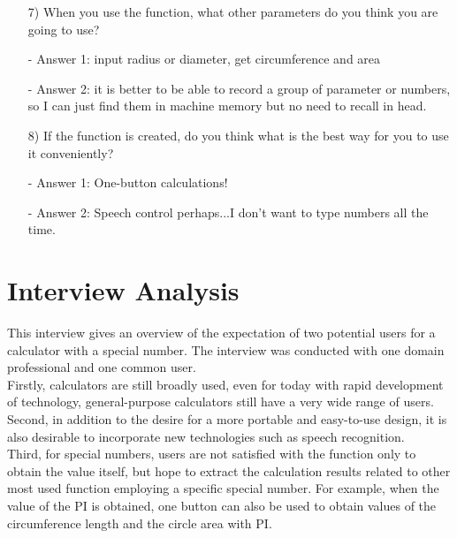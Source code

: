 \documentclass{article}
\begin{document}
\begin{itemize}
\item[7)]When you use the function, what other parameters do you think you are going to use?
\item[-]Answer 1: input radius or diameter, get circumference and area
\item[-]Answer 2: it is better to be able to record a group of parameter or numbers, so I can just find them in machine memory but no need to recall in head.

\item[8)]If the function is created, do you think what is the best way for you to use it conveniently?
\item[-]Answer 1: One-button calculations!
\item[-]Answer 2: Speech control perhaps...I don't want to type numbers all the time.

\end{itemize}

\section{Interview Analysis}
This interview gives an overview of  the expectation of two potential users for a calculator with a special number.  The interview was conducted with one domain professional and one common user.\\ 
 \hfill\break
Firstly, calculators are still broadly used, even for today with rapid development of technology, general-purpose calculators still have a very wide range of users.\\
 \hfill\break
Second, in addition to the desire for a more portable and easy-to-use design, it is also desirable to incorporate new technologies such as speech recognition.\\
Third, for special numbers, users are not satisfied with the function only to obtain the value itself, but hope to extract the calculation results related to other most used function employing a specific special number. For example, when the value of the PI is obtained, one button can also be used to obtain values of the circumference length and the circle area with PI.
\end{document}
